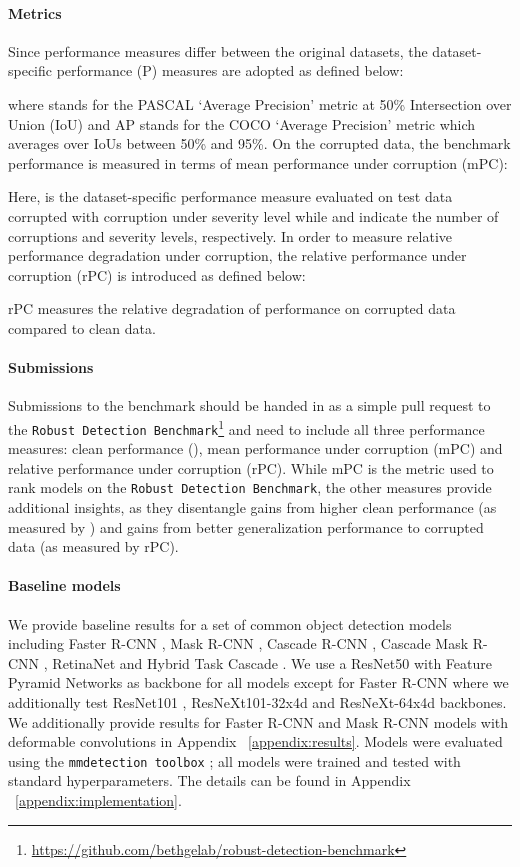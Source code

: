 \documentclass{article}
\begin{document}
\paragraph{Metrics} Since performance measures differ between the original datasets, the dataset-specific performance (P) measures are adopted as defined below:

\noindent
where  stands for the PASCAL `Average Precision' metric at 50\% Intersection over Union (IoU) and AP stands for the COCO `Average Precision' metric which averages over IoUs between 50\% and 95\%.
On the corrupted data, the benchmark performance is measured in terms of mean performance under corruption (mPC):

\noindent
Here,  is the dataset-specific performance measure evaluated on test data corrupted with corruption  under severity level  while  and  indicate the number of corruptions and severity levels, respectively. In order to measure relative performance degradation under corruption, the relative performance under corruption (rPC) is introduced as defined below:

\noindent
rPC measures the relative degradation of performance on corrupted data compared to clean data.

\paragraph{Submissions} Submissions to the benchmark should be handed in as a simple pull request to the \texttt{Robust Detection Benchmark}\footnote{\url{https://github.com/bethgelab/robust-detection-benchmark}} and need to include all three performance measures: clean performance (), mean performance under corruption (mPC) and relative performance under corruption (rPC). While mPC is the metric used to rank models on the \texttt{Robust Detection Benchmark}, the other measures provide additional insights, as they disentangle gains from higher clean performance (as measured by ) and gains from better generalization performance to corrupted data (as measured by rPC).


\paragraph{Baseline models}
We provide baseline results for a set of common object detection models including Faster R-CNN \citep{Ren2015}, Mask R-CNN \citep{He2017}, Cascade R-CNN \citep{Cai18cascadercnn}, Cascade Mask R-CNN \citep{Chen2019hybrid}, RetinaNet \citep{Lin2017b} and Hybrid Task Cascade \citep{Chen2019hybrid}. We use a ResNet50 \citep{He2016} with Feature Pyramid Networks \citep{Lin2017} as backbone for all models except for Faster R-CNN where we additionally test ResNet101 \citep{He2016}, ResNeXt101-32x4d \citep{Xie2017resnext} and ResNeXt-64x4d \citep{Xie2017resnext} backbones. We additionally provide results for Faster R-CNN and Mask R-CNN models with deformable convolutions \citep{dai2017deformable, zhu2018deformable} in Appendix ~\ref{appendix:results}. Models were evaluated using the \texttt{mmdetection toolbox} \citep{mmdetection}; all models were trained and tested with standard hyperparameters. The details can be found in Appendix ~\ref{appendix:implementation}.
\end{document}
